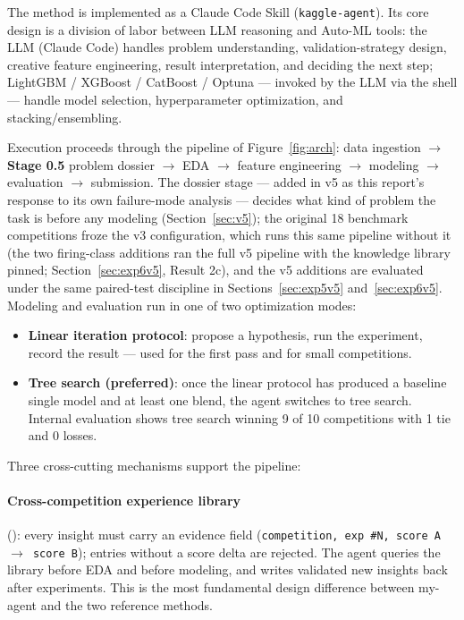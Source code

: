 \documentclass[11pt,a4paper]{article}
\begin{document}
The method is implemented as a Claude Code Skill (\texttt{kaggle-agent}). Its core design is a division of labor between LLM reasoning and Auto-ML tools: the LLM (Claude Code) handles problem understanding, validation-strategy design, creative feature engineering, result interpretation, and deciding the next step; LightGBM / XGBoost / CatBoost / Optuna --- invoked by the LLM via the shell --- handle model selection, hyperparameter optimization, and stacking/ensembling.

Execution proceeds through the pipeline of Figure~\ref{fig:arch}: data ingestion $\to$ \textbf{Stage 0.5} problem dossier $\to$ EDA $\to$ feature engineering $\to$ modeling $\to$ evaluation $\to$ submission. The dossier stage --- added in v5 as this report's response to its own failure-mode analysis --- decides what kind of problem the task is before any modeling (Section~\ref{sec:v5}); the original 18 benchmark competitions froze the v3 configuration, which runs this same pipeline without it (the two firing-class additions ran the full v5 pipeline with the knowledge library pinned; Section~\ref{sec:exp6v5}, Result 2c), and the v5 additions are evaluated under the same paired-test discipline in Sections~\ref{sec:exp5v5} and~\ref{sec:exp6v5}. Modeling and evaluation run in one of two optimization modes:

\begin{itemize}[leftmargin=*]
  \item \textbf{Linear iteration protocol}: propose a hypothesis, run the experiment, record the result --- used for the first pass and for small competitions.
  \item \textbf{Tree search (preferred)}: once the linear protocol has produced a baseline single model and at least one blend, the agent switches to tree search. Internal evaluation shows tree search winning 9 of 10 competitions with 1 tie and 0 losses.
\end{itemize}

Three cross-cutting mechanisms support the pipeline:

\paragraph{Cross-competition experience library} (): every insight must carry an evidence field (\texttt{competition, exp \#N, score A $\to$ score B}); entries without a score delta are rejected. The agent queries the library before EDA and before modeling, and writes validated new insights back after experiments. This is the most fundamental design difference between my-agent and the two reference methods.
\end{document}
